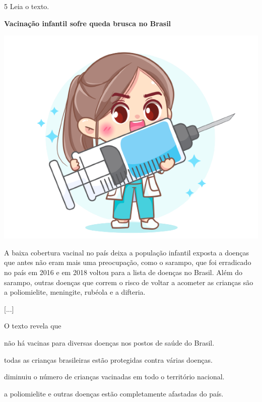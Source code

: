 \num{5} Leia o texto.

\begin{myquote}
\textbf{Vacinação infantil sofre queda brusca no Brasil}

\begin{center}
\includegraphics[width=.5\textwidth]{./media/image23g.png}
\end{center}

A baixa cobertura vacinal no país deixa a população infantil exposta a
doenças que antes não eram mais uma preocupação, como o sarampo, que foi
erradicado no país em 2016 e em 2018 voltou para a lista de doenças no
Brasil. Além do sarampo, outras doenças que correm o risco de voltar a
acometer as crianças são a poliomielite, meningite, rubéola e a
difteria.

{[}...{]}

\end{myquote}

O texto revela que

\begin{escolha}
\item não há vacinas para diversas doenças nos postos de saúde do Brasil.

\item todas as crianças brasileiras estão protegidas contra várias doenças.

\item diminuiu o número de crianças vacinadas em todo o território nacional.

\item a poliomielite e outras doenças estão completamente afastadas do país.
\end{escolha}


